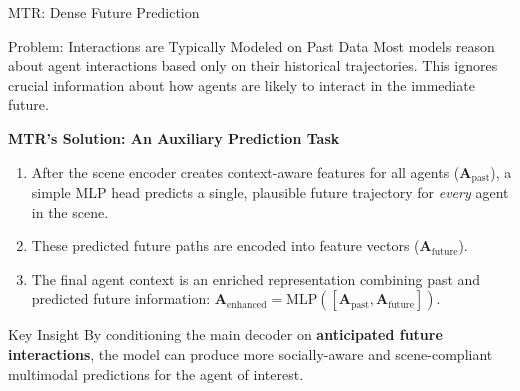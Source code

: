 \documentclass[10pt,aspectratio=169]{beamer}
\begin{document}
\begin{frame}{MTR: Dense Future Prediction}
    \begin{block}{Problem: Interactions are Typically Modeled on Past Data}
        Most models reason about agent interactions based only on their historical trajectories. This ignores crucial information about how agents are likely to interact in the immediate future.
    \end{block}

    \textbf{MTR's Solution: An Auxiliary Prediction Task}
    \begin{enumerate}
        \item After the scene encoder creates context-aware features for all agents ($\mathbf{A}_{\text{past}}$), a simple MLP head predicts a single, plausible future trajectory for \emph{every} agent in the scene.
        \item These predicted future paths are encoded into feature vectors ($\mathbf{A}_{\text{future}}$).
        \item The final agent context is an enriched representation combining past and predicted future information: $\mathbf{A}_{\text{enhanced}} = \text{MLP}([\mathbf{A}_{\text{past}}, \mathbf{A}_{\text{future}}])$.
    \end{enumerate}

    \begin{alertblock}{Key Insight}
        By conditioning the main decoder on \textbf{anticipated future interactions}, the model can produce more socially-aware and scene-compliant multimodal predictions for the agent of interest.
    \end{alertblock}
\end{frame}
\end{document}
